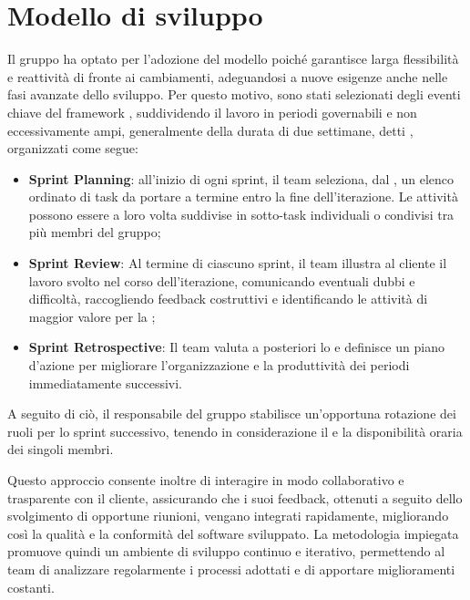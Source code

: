 \section{Modello di sviluppo}
Il gruppo ha optato per l'adozione del modello  poiché garantisce larga flessibilità e reattività di fronte ai cambiamenti, adeguandosi a nuove esigenze anche nelle fasi avanzate dello sviluppo. Per questo motivo, sono stati selezionati degli eventi chiave del framework , suddividendo il lavoro in periodi governabili e non eccessivamente ampi, generalmente della durata di due settimane, detti , organizzati come segue:
\begin{itemize}
\item \textbf{Sprint Planning}: all'inizio di ogni sprint, il team seleziona, dal , un elenco ordinato di task da portare a termine entro la fine dell'iterazione. Le attività possono essere a loro volta suddivise in sotto-task individuali o condivisi tra più membri del gruppo;
\item \textbf{Sprint Review}: Al termine di ciascuno sprint, il team illustra al cliente il lavoro svolto nel corso dell'iterazione, comunicando eventuali dubbi e difficoltà, raccogliendo feedback costruttivi e identificando le attività di maggior valore per la ;
\item \textbf{Sprint Retrospective}: Il team valuta a posteriori lo  e definisce un piano d'azione per migliorare l'organizzazione e la produttività dei periodi immediatamente successivi.
\end{itemize}
A seguito di ciò, il responsabile del gruppo stabilisce un'opportuna rotazione dei ruoli per lo sprint successivo, tenendo in considerazione il  e la disponibilità oraria dei singoli membri.

Questo approccio consente inoltre di interagire in modo collaborativo e trasparente con il cliente, assicurando che i suoi feedback, ottenuti a seguito dello svolgimento di opportune riunioni, vengano integrati rapidamente, migliorando così la qualità e la conformità del software sviluppato.
La metodologia impiegata promuove quindi un ambiente di sviluppo continuo e iterativo, permettendo al team di analizzare regolarmente i processi adottati e di apportare miglioramenti costanti.